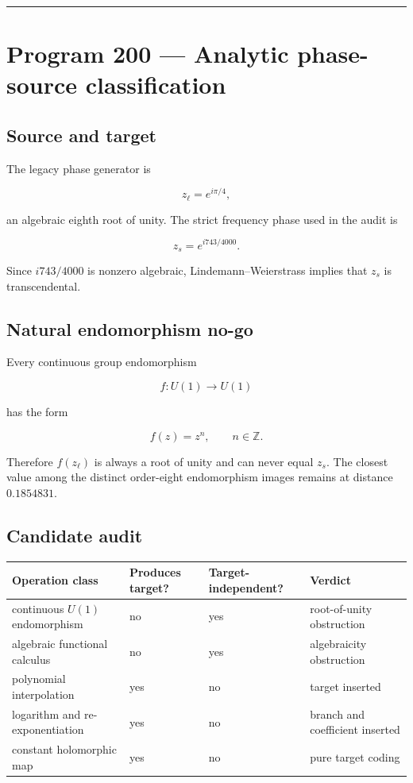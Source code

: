\documentclass[11pt,a4paper,openany]{report}
\begin{document}
\par\medskip\hrule\medskip

\chapter{Program 200 --- Analytic phase-source classification}

\section{Source and target}

The legacy phase generator is

\[
z_\ell=e^{i\pi/4},
\]

an algebraic eighth root of unity. The strict frequency phase used in the audit is

\[
z_s=e^{i743/4000}.
\]

Since \(i743/4000\) is nonzero algebraic, Lindemann--Weierstrass implies that \(z_s\) is transcendental.

\section{Natural endomorphism no-go}

Every continuous group endomorphism

\[
f:U(1)\to U(1)
\]

has the form

\[
f(z)=z^n,
\qquad n\in\mathbb Z.
\]

Therefore \(f(z_\ell)\) is always a root of unity and can never equal \(z_s\). The closest value among the distinct order-eight endomorphism images remains at distance \(0.1854831\).

\section{Candidate audit}

\begin{center}
\begingroup\small
\setlength{\tabcolsep}{3.5pt}
\renewcommand{\arraystretch}{1.16}
\begin{longtable}{@{}p{}p{}p{}p{}@{}}
\toprule
\textbf{Operation class} & \textbf{Produces target?} & \textbf{Target-independent?} & \textbf{Verdict} \\
\midrule
\endhead
continuous \(U(1)\) endomorphism & no & yes & root-of-unity obstruction \\
algebraic functional calculus & no & yes & algebraicity obstruction \\
polynomial interpolation & yes & no & target inserted \\
logarithm and re-exponentiation & yes & no & branch and coefficient inserted \\
constant holomorphic map & yes & no & pure target coding \\
\bottomrule
\end{longtable}
\endgroup
\end{center}
\end{document}
